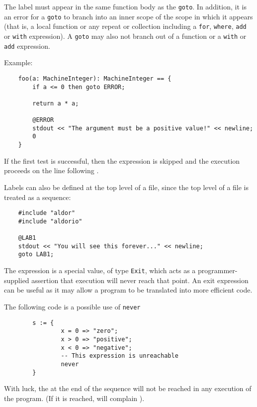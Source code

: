 The label must appear in the same function body as the \verb"goto". In
addition, it is an error for a \verb"goto" to branch into an inner scope
of the scope in which it appears (that is, %
a local function or any repeat or
collection including a {\tt for}, {\tt where}, {\tt add} or {\tt with}
expression). A \verb"goto" may also not branch out of a function or a
{\tt with} or {\tt add} expression.

Example:

\begin{small}
\begin{verbatim}
    foo(a: MachineInteger): MachineInteger == {
        if a <= 0 then goto ERROR;

        return a * a;

        @ERROR
        stdout << "The argument must be a positive value!" << newline;
        0
    }
\end{verbatim}
\end{small}

If the first test is successful, then the  expression
is skipped and the execution proceeds on the line following \ttin{\@ERROR}.

Labels can also be defined at the top level of a file,
since the top level of a file is treated as a sequence:

\begin{small}
\begin{verbatim}
    #include "aldor"
    #include "aldorio"

    @LAB1
    stdout << "You will see this forever..." << newline;
    goto LAB1;
\end{verbatim}
\end{small}


The expression  is a special value, of type \verb"Exit",
which acts as a programmer-supplied assertion that execution will never
reach that point.  An exit expression can be useful
as it may allow a program to be translated into more efficient code.

The following \asharp{} code is a possible use of {\tt never}

\begin{small}\begin{verbatim}
        s := {
                x = 0 => "zero";
                x > 0 => "positive";
                x < 0 => "negative";
                -- This expression is unreachable
                never
        }
\end{verbatim}
\end{small}

With luck, the  at the end of the sequence will not be
reached in any execution of the program.  (If it is reached, \asharp{}
will complain \linebreak {}).
